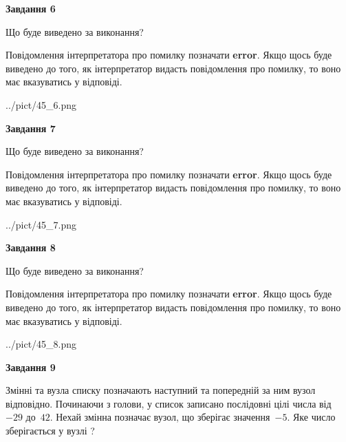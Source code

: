 \documentclass[12pt, ukrainian]{article}
\begin{document}
{\begin {large}
{\begin {center}\textbf{Завдання 6}\end {center}}\par
Що буде виведено за виконання?

Повідомлення інтерпретатора про помилку позначати \textbf{error}.
Якщо щось буде виведено до того, як інтерпретатор видасть повідомлення про помилку, 
то воно має вказуватись у відповіді. \par


\begin{center}
	{../pict/45_6.png}
\end{center}
\newpage

{\begin {center}\textbf{Завдання 7}\end {center}}\par
Що буде виведено за виконання?

Повідомлення інтерпретатора про помилку позначати \textbf{error}.
Якщо щось буде виведено до того, як інтерпретатор видасть повідомлення про помилку, 
то воно має вказуватись у відповіді. \par


\begin{center}
	{../pict/45_7.png}
\end{center}
\newpage

{\begin {center}\textbf{Завдання 8}\end {center}}\par
Що буде виведено за виконання?

Повідомлення інтерпретатора про помилку позначати \textbf{error}.
Якщо щось буде виведено до того, як інтерпретатор видасть повідомлення про помилку, 
то воно має вказуватись у відповіді. \par


\begin{center}
	{../pict/45_8.png}
\end{center}
\newpage

{\begin {center}\textbf{Завдання 9}\end {center}}\par
Змінні  та  вузла списку позначають наступний та попередній за ним вузол відповідно. Починаючи з голови, у список записано послідовні цілі числа від~$-29$ до~$42$. Нехай змінна  позначає вузол, що зберігає значення~$-5$.
Яке число зберігається у вузлі  ?\par
\newpage


\end{large}}
\end{document}
